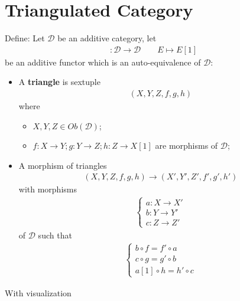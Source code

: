 \documentclass[Total.tex]{subfiles}
\begin{document}
		\section{Triangulated Category}
			\begin{Def}
				Define: Let $\mathcal{D}$ be an additive category, let
				\begin{gather*}
					[1]:\mathcal{D}\rightarrow \mathcal{D}\qquad E\mapsto E[1]
				\end{gather*}
				be an additive functor which is an auto-equivalence of $\mathcal{D}$:
				\begin{itemize}
					\item A \textbf{triangle} is sextuple
					\begin{gather*}
						(X,Y,Z,f,g,h)
					\end{gather*}
					where
					\begin{itemize}
						\item $X,Y,Z\in Ob(\mathcal{D})$;
						\item $f:X\rightarrow Y;g:Y\rightarrow Z;h:Z\rightarrow X[1]$ are morphisms of $\mathcal{D}$;
					\end{itemize}
					\item A morphism of triangles
					\begin{gather*}
						(X,Y,Z,f,g,h)\rightarrow (X',Y',Z',f',g',h')
					\end{gather*}
					with morphisms
					\begin{gather*}
						\begin{cases}
							a:X\rightarrow X'\\
							b:Y\rightarrow Y'\\
							c:Z\rightarrow Z'
						\end{cases}
					\end{gather*}
					of $\mathcal{D}$ such that
					\begin{gather*}
						\begin{cases}
							b\circ f=f'\circ a\\
							c\circ g=g'\circ b\\
							a[1]\circ h=h'\circ c
						\end{cases}
					\end{gather*}
				\end{itemize}
				With visualization
				\begin{center}
				\end{center}
			\end{Def}
			
\end{document}
